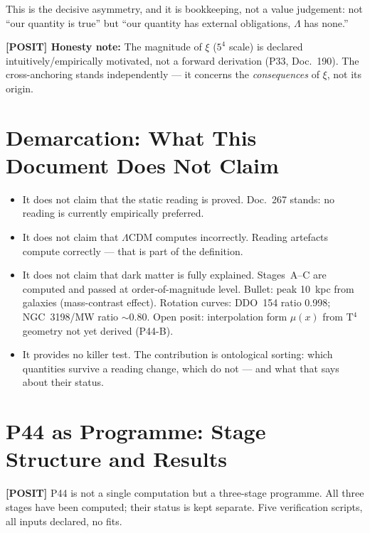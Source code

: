 This is the decisive asymmetry, and it is bookkeeping, not a value
judgement: not ``our quantity is true'' but ``our quantity has external
obligations, $\Lambda$ has none.''

\medskip
\noindent\textbf{[POSIT] Honesty note:} The magnitude of $\xi$
($5^4$ scale) is declared intuitively/empirically motivated, not a
forward derivation (P33, Doc.~190). The cross-anchoring stands
independently — it concerns the \emph{consequences} of $\xi$, not
its origin.

\chapter{Demarcation: What This Document Does Not Claim}

\begin{itemize}
  \item It does not claim that the static reading is proved.
        Doc.~267 stands: no reading is currently empirically preferred.
  \item It does not claim that $\Lambda$CDM computes incorrectly.
        Reading artefacts compute correctly — that is part of the
        definition.
  \item It does not claim that dark matter is fully explained.
        Stages~A–C are computed and passed at order-of-magnitude level.
        Bullet: peak 10~kpc from galaxies (mass-contrast effect).
        Rotation curves: DDO~154 ratio 0.998; NGC~3198/MW ratio $\sim$0.80.
        Open posit: interpolation form $\mu(x)$ from T$^4$ geometry
        not yet derived (P44-B).
  \item It provides no killer test. The contribution is ontological
        sorting: which quantities survive a reading change, which do not
        — and what that says about their status.
\end{itemize}

\chapter{P44 as Programme: Stage Structure and Results}

\textbf{[POSIT]} P44 is not a single computation but a three-stage
programme. All three stages have been computed; their status is kept
separate. Five verification scripts, all inputs declared, no fits.


